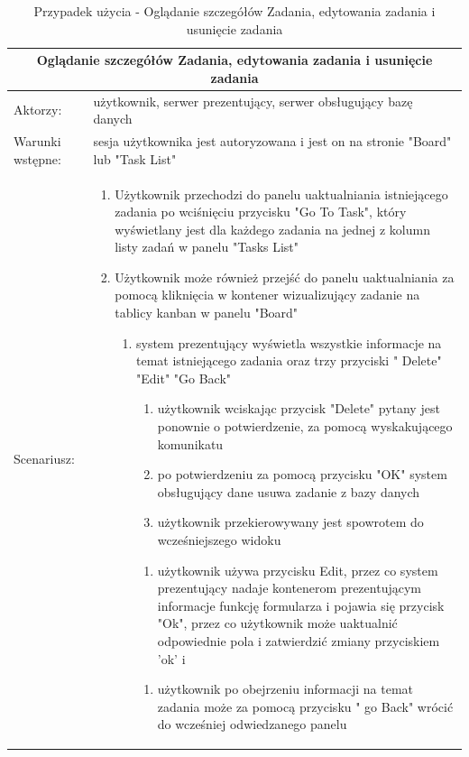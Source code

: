 \begin{table}[h!]
		
	\begin{tabular}{ |p{2cm}||p{13cm}|  }
		
		\hline
		\multicolumn{2}{|c|}{Oglądanie szczegółów Zadania, edytowania zadania i usunięcie zadania} \\
		\hline
Aktorzy: &użytkownik, serwer prezentujący, serwer obsługujący bazę danych\\
		\hline
Warunki wstępne: & sesja użytkownika jest autoryzowana i jest on na stronie "Board" lub "Task List"\\
		\hline
		Scenariusz: &
		
		\begin{enumerate}


	\item Użytkownik przechodzi do panelu uaktualniania istniejącego zadania po wciśnięciu przycisku "Go To Task", który wyświetlany jest dla każdego zadania na jednej z kolumn  listy zadań w panelu "Tasks List" 
	\item Użytkownik może również przejść do panelu uaktualniania za pomocą kliknięcia w kontener wizualizujący zadanie na tablicy kanban w panelu "Board"
		\begin{enumerate}
		\item system prezentujący wyświetla wszystkie informacje na temat istniejącego zadania oraz trzy przyciski " Delete" "Edit" "Go Back"
		\begin{enumerate}
			\item użytkownik wciskając przycisk "Delete" pytany jest ponownie o potwierdzenie, za pomocą wyskakującego komunikatu
			\item po potwierdzeniu za pomocą przycisku "OK" system obsługujący dane usuwa  zadanie z bazy danych
			\item użytkownik przekierowywany jest spowrotem do wcześniejszego widoku
		\end{enumerate}
		\begin{enumerate}
			\item użytkownik używa przycisku Edit, przez co system prezentujący nadaje kontenerom prezentującym informacje funkcję formularza i pojawia się przycisk "Ok", przez co użytkownik może uaktualnić odpowiednie pola i zatwierdzić zmiany przyciskiem 'ok' i 
		\end{enumerate}
		\begin{enumerate}
			\item użytkownik po obejrzeniu informacji na temat zadania może za pomocą przycisku " go Back" wrócić do wcześniej odwiedzanego panelu
		\end{enumerate}
	\end{enumerate}
\end{enumerate}\\
\hline
\end{tabular}
\caption{Przypadek użycia - Oglądanie szczegółów Zadania, edytowania zadania i usunięcie zadania}
\end{table}

